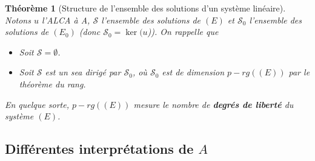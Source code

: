 \documentclass[french]{book}
\theoremstyle{plain}
\newtheorem{thm}{Théorème}[chapter]
\theoremstyle{definition}
\theoremstyle{remark}
\begin{document}
\begin{thm}[Structure de l'ensemble des solutions d'un système linéaire]
	Notons $u$ l'ALCA à A, $\mathcal{S}$ l'ensemble des solutions de $(E)$ et $\mathcal{S}_0$ l'ensemble des solutions de $(E_0)$ (donc $\mathcal{S}_0=\ker(u$)). On rappelle que \begin{itemize}
		\item Soit $\mathcal{S}=\emptyset$.
		\item Soit $\mathcal{S}$ est un sea dirigé par $\mathcal{S}_0$, où $\mathcal{S}_0$ est de dimension $p-rg((E))$ par le théorème du rang.
	\end{itemize}
	En quelque sorte, $p-rg((E))$ mesure le nombre de \textbf{degrés de liberté} du système $(E)$.
\end{thm}
\subsection{Différentes interprétations de $A$}
\end{document}
